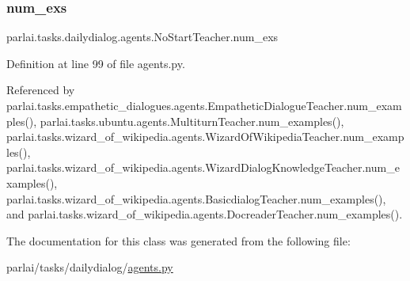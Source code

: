 \mbox{\label{classparlai_1_1tasks_1_1dailydialog_1_1agents_1_1NoStartTeacher_aab39a1a4cec18469e61f2431e85b6fd1}} 
\subsubsection{\texorpdfstring{num\+\_\+exs}{num\_exs}}
{\footnotesize\ttfamily parlai.\+tasks.\+dailydialog.\+agents.\+No\+Start\+Teacher.\+num\+\_\+exs}



Definition at line 99 of file agents.\+py.



Referenced by parlai.\+tasks.\+empathetic\+\_\+dialogues.\+agents.\+Empathetic\+Dialogue\+Teacher.\+num\+\_\+examples(), parlai.\+tasks.\+ubuntu.\+agents.\+Multiturn\+Teacher.\+num\+\_\+examples(), parlai.\+tasks.\+wizard\+\_\+of\+\_\+wikipedia.\+agents.\+Wizard\+Of\+Wikipedia\+Teacher.\+num\+\_\+examples(), parlai.\+tasks.\+wizard\+\_\+of\+\_\+wikipedia.\+agents.\+Wizard\+Dialog\+Knowledge\+Teacher.\+num\+\_\+examples(), parlai.\+tasks.\+wizard\+\_\+of\+\_\+wikipedia.\+agents.\+Basicdialog\+Teacher.\+num\+\_\+examples(), and parlai.\+tasks.\+wizard\+\_\+of\+\_\+wikipedia.\+agents.\+Docreader\+Teacher.\+num\+\_\+examples().



The documentation for this class was generated from the following file\+:\begin{DoxyCompactItemize}
\item 
parlai/tasks/dailydialog/\hyperlink{parlai_2tasks_2dailydialog_2agents_8py}{agents.\+py}\end{DoxyCompactItemize}
